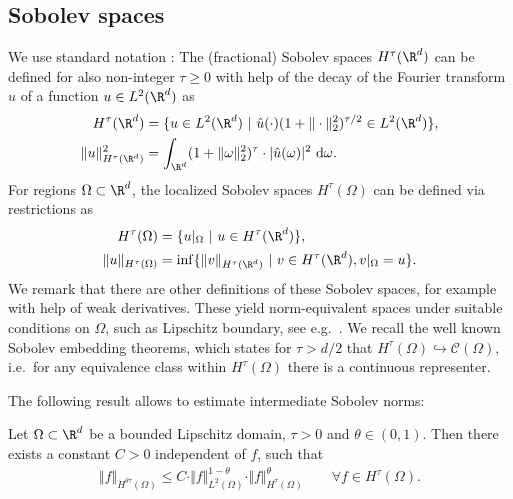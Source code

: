 \documentclass[a4paper, 10pt]{article}
\begin{document}
\subsection{Sobolev spaces}
\label{subsec:sobolev_spaces}

We use standard notation \cite{agranovich2015sobolev}: 
The (fractional) Sobolev spaces $H^\tau(\R^d)$ can be defined for also non-integer $\tau \geq 0$ with help of the decay of the Fourier transform $\hat{u}$ of a function $u \in L^2(\R^d)$ as
\begin{align}
\begin{aligned}
\label{eq:definition_sobolev_Rd}
H^\tau(\R^d) &= \{ u \in L^2(\R^d) ~ | ~ \hat{u}(\cdot)(1 + \Vert \cdot \Vert_2^2)^{\tau/2} \in L^2(\R^d) \}, \\
\Vert u \Vert_{H^\tau(\R^d)}^2 &= \int_{\R^d} (1+\Vert \omega \Vert_2^2)^{\tau} \cdot |\hat{u}(\omega)|^2 ~ \mathrm{d}\omega.
\end{aligned}
\end{align}
For regions $\Omega \subset \R^d$, the localized Sobolev spaces $H^\tau(\Omega)$ can be defined via restrictions as
\begin{align*}
H^\tau(\Omega) &= \{ u|_\Omega ~ | ~ u \in H^\tau(\R^d) \}, \\
\Vert u \Vert_{H^\tau(\Omega)} &= \inf \{\Vert v \Vert_{H^\tau(\R^d)} ~ | ~ v \in H^\tau(\R^d), v|_\Omega = u \}.
\end{align*}
We remark that there are other definitions of these Sobolev spaces, for example with help of weak derivatives.
These yield norm-equivalent spaces under suitable conditions on $\Omega$, such as Lipschitz boundary, 
see e.g.\ \cite{triebel2002function, rychkov1999restrictions}.
We recall the well known Sobolev embedding theorems, 
which states for $\tau > d/2$ that $H^\tau(\Omega) \hookrightarrow \mathcal{C}(\Omega)$,
i.e.\ for any equivalence class within $H^\tau(\Omega)$ there is a continuous representer.

The following result allows to estimate intermediate Sobolev norms:

\begin{prop}
\label{prop:hoelder_interpol}
Let $\Omega \subset \R^d$ be a bounded Lipschitz domain, $\tau > 0$ and $\theta \in (0, 1)$.
Then there exists a constant $C > 0$ independent of $f$, such that
\begin{align}
\label{eq:sobolev_interpol_inequality}
\Vert f \Vert_{H^{\theta \tau}(\Omega)} \leq C \cdot \Vert f \Vert_{L^2(\Omega)}^{1-\theta} \cdot \Vert f \Vert_{H^\tau(\Omega)}^\theta \qquad \forall f \in H^\tau(\Omega).
\end{align}
\end{prop}
\end{document}
